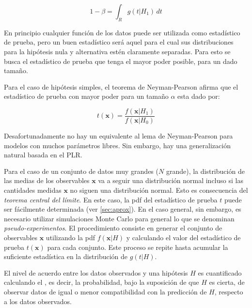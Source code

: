 \begin{equation}
1-\beta = \int_R g(t|H_1)\, dt
\end{equation}

En principio cualquier función de los datos puede ser utilizada como estadístico
de prueba, pero un buen estadístico será aquel para el cual sus distribuciones
para la hipótesis nula y alternativa estén claramente separadas. Para esto se
busca el estadístico de prueba que tenga el mayor poder posible, para un dado
tama\~no.

Para el caso de hipótesis simples, el teorema de Neyman-Pearson afirma que el
estadístico de prueba con mayor poder para un tama\~no $\alpha$ esta dado por:


\begin{equation}
  t(\bm{x}) = \frac{f(\bm{x}|H_1)}{f(\bm{x}|H_0)}
\end{equation}

Desafortunadamente no hay un equivalente al lema de Neyman-Pearson para modelos
con muchos parámetros libres. Sin embargo, hay una generalización natural basada
en el PLR.

Para el caso de un conjunto de datos muy grandes ($N$ grande), la distribución
de las medias de los observables $\bm{x}$ va a seguir una distribución normal
incluso si las cantidades medidas $\bm{x}$ no siguen una distribución normal.
Esto es consecuencia del \emph{teorema central del límite}. En este caso, la pdf
del estadístico de prueba $t$ puede ser fácilmente determinada (ver \cref{sec:aprox}).
En el caso
general, sin embargo, es necesario utilizar simulaciones Monte Carlo para
general lo que se denominan \emph{pseudo-experimentos}. El procedimiento
consiste en generar el conjunto de observables $\bm{x}$ utilizando la pdf
$f(\bm{x}|H)$ y calculando el valor del estadístico de prueba $t(\bm{x})$ para
cada conjunto. Este proceso se repite hasta acumular la suficiente estadística
en la distribución de $g(t|H)$.

El nivel de acuerdo entre los datos observados y una hipótesis $H$ es
cuantificado calculando el \emph{\pvalue}, es decir, la probabilidad, bajo la
suposición de que $H$ es cierta, de observar datos de igual o menor
compatibilidad con la predicción de $H$, respecto a los datos observados.

